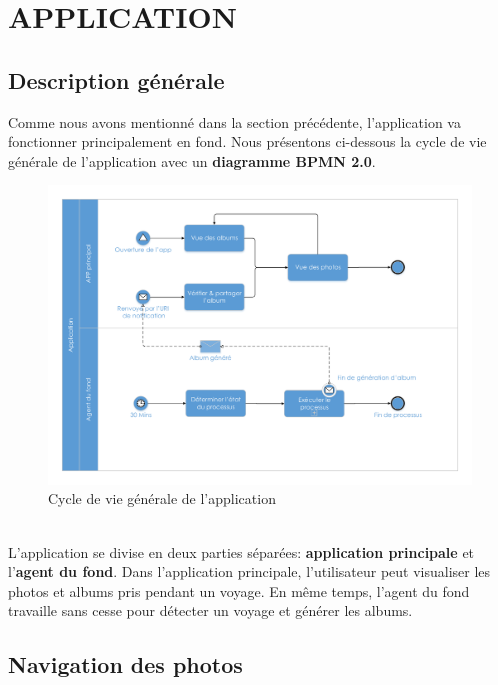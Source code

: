 \documentclass{article}
\begin{document}
\newpage
\section{\LARGE APPLICATION }

\vspace{0.2 cm}
\subsection{\Large Description générale}

Comme nous avons mentionné dans la section précédente, l'application va fonctionner principalement en fond. Nous présentons ci-dessous la cycle de vie générale de l'application avec un \textbf{diagramme BPMN 2.0}.

\begin{figure}[h!]
\centering
\includegraphics[width=160mm]{APP.pdf}
\caption{Cycle de vie générale de l'application}
\end{figure}

\ \\L'application se divise en deux parties séparées: \textbf{application principale} et l'\textbf{agent du fond}. Dans l'application principale, l'utilisateur peut visualiser les photos et albums pris pendant un voyage. En même temps, l'agent du fond travaille sans cesse pour détecter un voyage et générer les albums. 

\vspace{0.2 cm}
\subsection{\Large Navigation des photos}
\end{document}
